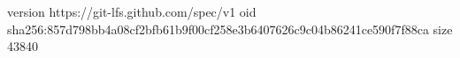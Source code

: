 version https://git-lfs.github.com/spec/v1
oid sha256:857d798bb4a08cf2bfb61b9f00cf258e3b6407626c9c04b86241ce590f7f88ca
size 43840
